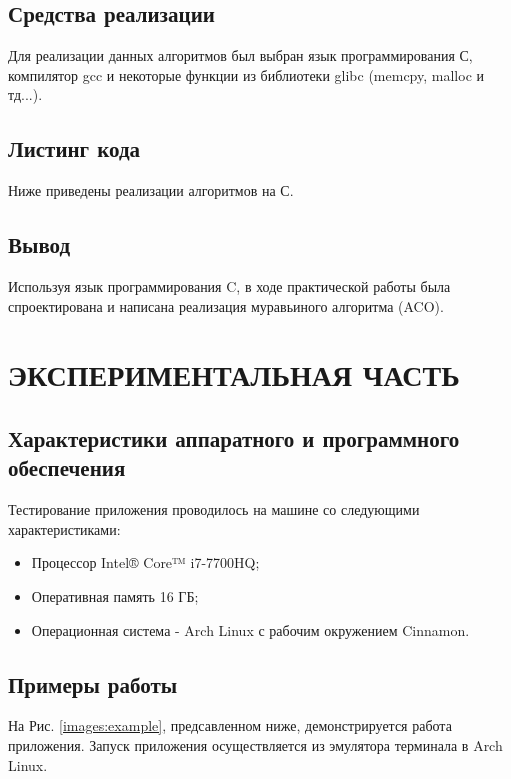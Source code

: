 \documentclass[a4paper,12pt]{article}
\begin{document}
\newpage
\subsection{Средства реализации}
Для реализации данных алгоритмов был выбран язык программирования С, компилятор gcc и некоторые функции из библиотеки glibc (memcpy, malloc и тд...). \\

\newpage
\subsection{Листинг кода}
Ниже приведены реализации алгоритмов на С.\\

%

\newpage
\subsection{Вывод}
Используя язык программирования C, в ходе практической работы была спроектирована и написана реализация муравьиного алгоритма (ACO).

\newpage
\section{ЭКСПЕРИМЕНТАЛЬНАЯ ЧАСТЬ}
\subsection{Характеристики аппаратного и программного обеспечения}
Тестирование приложения проводилось на машине со следующими характеристиками:\\
\begin{itemize}
\item Процессор Intel® Core™ i7-7700HQ;
\item Оперативная память 16 ГБ;
\item Операционная система - Arch Linux с рабочим окружением Cinnamon.
\end{itemize}

\newpage
\subsection{Примеры работы}
На Рис. \ref{images:example}, предсавленном ниже, демонстрируется работа приложения. Запуск приложения осуществляется из эмулятора терминала в Arch Linux.
\end{document}
